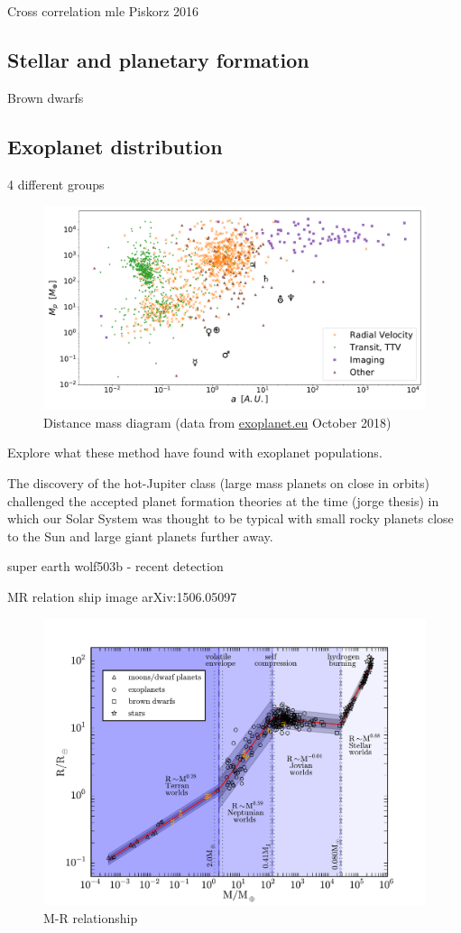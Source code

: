 Cross correlation mle  Piskorz 2016


\subsection{Stellar and planetary formation}

Brown dwarfs

\subsection{Exoplanet distribution} 4 different groups

\fref{}


\begin{figure}
    \centering
    \includegraphics[width=0.7\linewidth]{./figures/introduction/exoplanetEU_a_mass.pdf}
    \caption{Distance mass diagram (data from \href{http://ww.exoplanet.eu}{exoplanet.eu} October 2018)}
    \label{fig:pltoverlayadd}
\end{figure}


Explore what these method have found with exoplanet populations.

The discovery of the hot-Jupiter class (large mass planets on close in orbits) challenged the accepted planet formation theories at the time \citep[.e.g][]{pollack_formation_1996}(jorge thesis) in which our Solar System was thought to be typical with small rocky planets close to the Sun and large giant planets further away.


super earth wolf503b - recent detection


MR relation ship image arXiv:1506.05097~\citet{chen_probabilistic_2016}

\begin{figure}
    \centering
    \includegraphics[width=0.4\linewidth]{./figures/introduction/mass_radius_relation.pdf}
    \caption{M-R relationship~\citet{chen_probabilistic_2016}}
    \label{fig:mass_radius_relation}
\end{figure}

